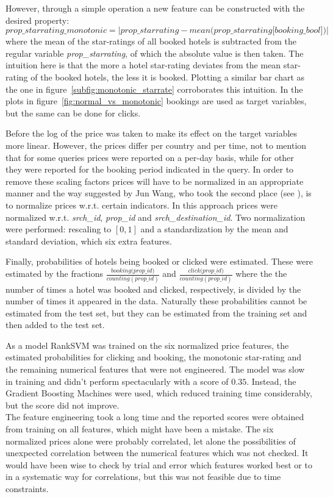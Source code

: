 \documentclass{llncs}
\begin{document}
\noindent However, through a simple operation a new feature can be constructed with the desired property: 
\begin{equation*}
    \textit{prop\_starrating\_monotonic} = |\textit{prop\_starrating} - \textit{mean(prop\_starrating[booking\_bool])}|
\end{equation*}
where the mean of the star-ratings of all booked hotels is subtracted from the regular variable \textit{prop\_starrating}, of which the absolute value is then taken. The intuition here is that the more a hotel star-rating deviates from the mean star-rating of the booked hotels, the less it is booked. Plotting a similar bar chart as the one in figure~\ref{subfig:monotonic_starrate} corroborates this intuition. In the plots in figure~\ref{fig:normal_vs_monotonic} bookings are used as target variables, but the same can be done for clicks.

Before the log of the price was taken to make its effect on the target variables more linear. However, the prices differ per country and per time, not to mention that for some queries prices were reported on a per-day basis, while for other they were reported for the booking period indicated in the query. In order to remove these scaling factors prices will have to be normalized in an appropriate manner and the way suggested by Jun Wang, who took the second place (see \cite{Wang2013}), is to normalize prices w.r.t. certain indicators.  In this approach prices were normalized w.r.t. \textit{srch\_id}, \textit{prop\_id} and \textit{srch\_destination\_id}. Two normalization were performed: rescaling to $[0,1]$ and a standardization by the mean and standard deviation, which six extra features.

Finally, probabilities of hotels being booked or clicked were estimated. These were estimated by the fractions $\displaystyle \frac{\textit{booking(prop\_id)}}{counting(prop\_id)}$ and $\displaystyle \frac{\textit{click(prop\_id)}}{counting(prop\_id)}$ where the the number of times a hotel was booked and clicked, respectively, is divided by the number of times it appeared in the data. Naturally these probabilities cannot be estimated from the test set, but they can be estimated from the training set and then added to the test set.

As a model RankSVM was trained on the six normalized price features, the estimated probabilities for clicking and booking, the monotonic star-rating and the remaining numerical features that were not engineered. The model was slow in training and didn't perform spectacularly with a score of $0.35$. Instead, the Gradient Boosting Machines were used, which reduced training time considerably, but the score did not improve.\\
\indent The feature engineering took a long time and the reported scores were obtained from training on all features, which might have been a mistake. The six normalized prices alone were probably correlated, let alone the possibilities of unexpected correlation between the numerical features which was not checked. It would have been wise to check by trial and error which features worked best or to in a systematic way for correlations, but this was not feasible due to time constraints. 
\end{document}
